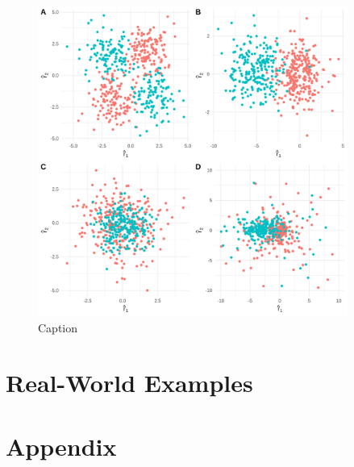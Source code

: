 \documentclass[12pt]{article}
\begin{document}
\begin{figure}
    \centering
    \includegraphics[width=4in]{figures/sim_rvs.png}
    \caption{Caption}
    \label{fig:sim_rvs}
\end{figure}

\section{Real-World Examples}


\section*{Appendix}




\end{document}
